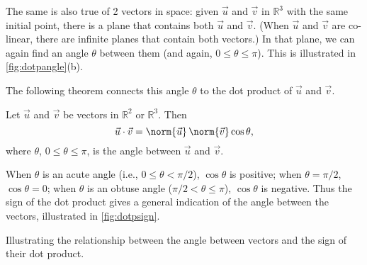 The same is also true of 2 vectors in space: given $\vec u$ and $\vec v$ in $\mathbb{R}^3$ with the same initial point, there is a plane that contains both $\vec u$ and $\vec v$. (When $\vec u$ and $\vec v$ are co-linear, there are infinite planes that contain both vectors.) In that plane, we can again find an angle $\theta$ between them (and again, $0\leq \theta\leq \pi$). This is illustrated in \autoref{fig:dotpangle}(b).

The following theorem connects this angle $\theta$ to the dot product of $\vec u$ and $\vec v$.

\begin{theorem}\label{thm:dot_product}
Let $\vec u$ and $\vec v$ be vectors in $\mathbb{R}^2$ or $\mathbb{R}^3$. Then 
\[\vec u\cdot\vec v = \norm{\vec u}\,\norm{\vec v} \cos\theta,\]
where $\theta$, $0\leq\theta\leq \pi$, is the angle between $\vec u$ and $\vec v$.
\end{theorem}

When $\theta$ is an acute angle (i.e., $0\leq \theta <\pi/2$), $\cos \theta$ is positive; when $\theta = \pi/2$, $\cos \theta = 0$; when $\theta$ is an obtuse angle ($\pi/2<\theta \leq \pi$), $\cos \theta$ is negative. Thus the sign of the dot product gives a general indication of the angle between the vectors, illustrated in \autoref{fig:dotpsign}.

\noindent\begin{minipage}[t]{\linewidth}\noindent%
\captionsetup{type=figure}%
\centering
{}
\caption{Illustrating the relationship between the angle between vectors and the sign of their dot product.}
\label{fig:dotpsign}
\end{minipage}

